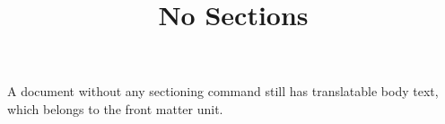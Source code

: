 \documentclass{article}
\title{No Sections}
\begin{document}
\maketitle
A document without any sectioning command still has translatable body text, which belongs to the front matter unit.
\end{document}
